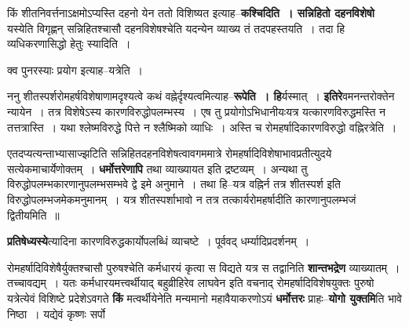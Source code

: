\documentclass[article,12pt,a4paper]{memoir}
\begin{document}
	  \endgroup
	

	  \pstart किं \leavevmode{} शीतनिवर्त्तनाऽक्षमोऽप्यस्ति दहनो येन ततो विशिष्यत इत्याह--\textbf{कश्चिदिति । सन्निहितो दहनविशेषो} यस्येति विगृह्णन् सन्निहितश्चासौ दहनविशेषश्चेति यदन्येन व्याख्य तं तदपहस्तयति । तदा हि व्यधिकरणासिद्धो हेतुः स्यादिति ।
	\pend
      

	  \pstart क्व पुनरस्याः प्रयोग इत्याह--यत्रेति ।
	\pend
      

	  \pstart ननु शीतस्पर्शरोमहर्षविशेषाणामदृश्यत्वे कथं वह्नेर्दृश्यत्वमित्याह--\textbf{रूपेति । हि}र्यस्मात् । \textbf{इतिरे}वमनन्तरोक्तेन न्यायेन । तत्र विशेषेऽस्य कारणविरुद्धोपलम्भस्य । एष तु प्रयोगोऽभिधानीयःयत्र यत्कारणविरुद्धमस्ति न तत्तत्रास्ति । यथा श्लेष्मविरुद्धे पित्ते न श्लैष्मिको व्याधिः । अस्ति च रोमहर्षादिकारणविरुद्धो वह्निरत्रेति ।
	\pend
      

	  \pstart एतदप्यत्यन्ताभ्यासाज्झटिति सन्निहितदहनविशेषत्वावगममात्रे रोमहर्षादिविशेषाभावप्रतीत्युदये सत्येकमाचार्येणोक्तम् । \textbf{धर्मोत्तरेणापि} तथा व्याख्यायत इति द्रष्टव्यम् । अन्यथा तु विरुद्धोपलम्भकारणानुपलम्भसम्भवे द्वे इमे अनुमाने । तथा हि--यत्र वह्निर्न तत्र शीतस्पर्श इति विरुद्धोपलम्भजमेकमनुमानम् । यत्र शीतस्पर्शाभावो न तत्र तत्कार्यरोमहर्षादीति कारणानुपलम्भजं द्वितीयमिति ॥
	\pend
      

	  \pstart \textbf{प्रतिषेध्यस्ये}त्यादिना कारणविरुद्धकार्योपलब्धिं व्याचष्टे । पूर्ववद् धर्म्यादिप्रदर्शनम् ।
	\pend
      

	  \pstart रोमहर्षादिविशेषैर्युक्तश्चासौ पुरुषश्चेति कर्मधारयं कृत्वा स विद्यते यत्र स तद्वानिति \textbf{शान्तभद्रेण} व्याख्यातम् । तच्चावद्यम् । यतः कर्मधारयमत्त्वर्थीयाद् बहुव्रीहिरेव लाघवेन  इति वचनाद् रोमहर्षादिविशेषयुक्तः पुरुषो यत्रेत्येवं विशिष्टे प्रदेशेऽवगते \textbf{किं} मत्वर्थीयेनेति मन्यमानो महावैयाकरणोऽयं \textbf{धर्मोत्तरः} प्राहः--\textbf{योगो युक्तमि}ति भावे निष्ठा । यद्येवं कृष्णः सर्पो  \leavevmode{} 
	  
\end{document}
